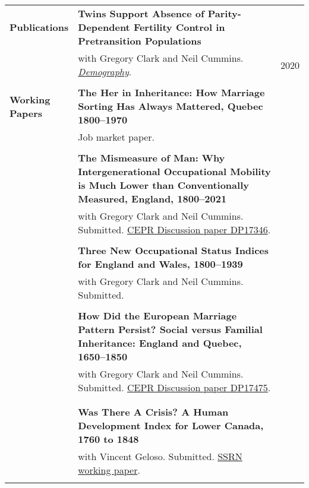 \documentclass[a4paper,11pt,oneside]{article}
\begin{document}
\begin{longtable}{@{} p{0.175\linewidth} p{0.775\linewidth} p{0.05\linewidth}}
     \textbf{\large{Publications}}   & \textbf{Twins Support Absence of Parity-Dependent Fertility Control in Pretransition Populations }\\
     &  with Gregory Clark and Neil Cummins. \href{https://read.dukeupress.edu/demography/article/57/4/1571/168109/Twins-Support-the-Absence-of-Parity-Dependent}{\emph{Demography}}. & \hfill 2020\\
     \\  


     \textbf{\large{Working \(\phantom{1}\)  Papers}}  & \textbf{The Her in Inheritance: How Marriage Sorting Has Always Mattered, Quebec 1800--1970}\\ 
     &  Job market paper. &  \\
        & &
       \\

    & \textbf{The Mismeasure of Man: Why Intergenerational Occupational Mobility  is Much Lower than Conventionally Measured, England, 1800--2021}\\ 
    &  with Gregory Clark and Neil Cummins. Submitted. \href{https://hub.cepr.org/published-discussion-paper/139739}{CEPR Discussion paper DP17346}. &    \\
       & &
      \\  
      & \textbf{Three New Occupational Status Indices for England and Wales, 1800--1939}\\ 
      &  with Gregory Clark and Neil Cummins. Submitted. &   \\
     \\

 & \textbf{How Did the European Marriage Pattern Persist? Social versus Familial Inheritance: England and Quebec, 1650--1850 }\\ 
     &   with Gregory Clark and Neil Cummins. Submitted. \href{https://hub.cepr.org/published-discussion-paper/170950}{CEPR Discussion paper DP17475}. & \\
      \\

      \\
     &  \textbf{Was There A Crisis? A Human Development Index for Lower Canada, 1760 to 1848 } \\ 
      &   with Vincent Geloso. Submitted. \href{https://papers.ssrn.com/sol3/papers.cfm?abstract_id=4200516}{SSRN working paper}. &  \\
      \\ 
 

\end{longtable}
\end{document}
